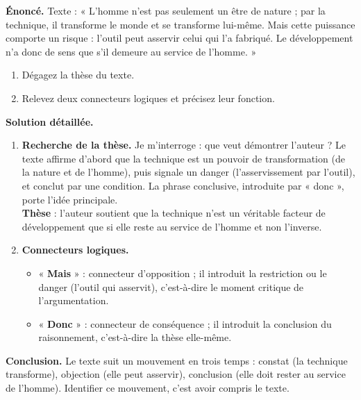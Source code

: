 \documentclass[11pt]{article}
\begin{document}
\begin{exoresolu}
\textbf{Énoncé.} Texte : « L'homme n'est pas seulement un être de nature ; par la technique, il transforme le monde et se transforme lui-même. Mais cette puissance comporte un risque : l'outil peut asservir celui qui l'a fabriqué. Le développement n'a donc de sens que s'il demeure au service de l'homme. »
\begin{enumerate}
\item Dégagez la thèse du texte.
\item Relevez deux connecteurs logiques et précisez leur fonction.
\end{enumerate}
\tcblower
\textbf{Solution détaillée.}
\begin{enumerate}
\item \textbf{Recherche de la thèse.} Je m'interroge : que veut démontrer l'auteur ? Le texte affirme d'abord que la technique est un pouvoir de transformation (de la nature et de l'homme), puis signale un danger (l'asservissement par l'outil), et conclut par une condition. La phrase conclusive, introduite par « donc », porte l'idée principale.\\
\textbf{Thèse} : l'auteur soutient que la technique n'est un véritable facteur de développement que si elle reste au service de l'homme et non l'inverse.
\item \textbf{Connecteurs logiques.}
\begin{itemize}
\item « \textbf{Mais} » : connecteur d'opposition ; il introduit la restriction ou le danger (l'outil qui asservit), c'est-à-dire le moment critique de l'argumentation.
\item « \textbf{Donc} » : connecteur de conséquence ; il introduit la conclusion du raisonnement, c'est-à-dire la thèse elle-même.
\end{itemize}
\end{enumerate}
\textbf{Conclusion.} Le texte suit un mouvement en trois temps : constat (la technique transforme), objection (elle peut asservir), conclusion (elle doit rester au service de l'homme). Identifier ce mouvement, c'est avoir compris le texte.
\end{exoresolu}
\end{document}
